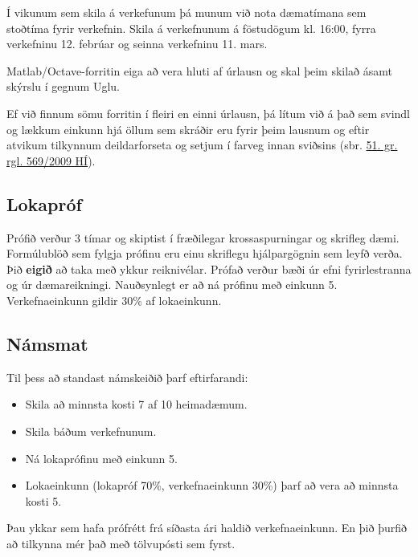 \documentclass[letterpaper,10pt,icelandic]{sphinxmanual}
\begin{document}
Í vikunum sem skila á verkefunum þá munum við nota dæmatímana sem stoðtíma fyrir verkefnin. Skila á verkefnunum á föstudögum kl. 16:00, fyrra verkefninu 12. febrúar og seinna verkefninu 11. mars.

Matlab/Octave-forritin eiga að vera hluti af úrlausn og skal þeim skilað ásamt skýrslu í gegnum Uglu.

Ef við finnum sömu forritin í fleiri en einni úrlausn, þá lítum við á það sem svindl og lækkum einkunn hjá öllum sem skráðir eru fyrir þeim lausnum og eftir atvikum tilkynnum deildarforseta og setjum í farveg innan sviðsins (sbr. \href{http://www.hi.is/adalvefur/reglur\_fyrir\_haskola\_islands\#51}{51. gr. rgl. 569/2009 HÍ}).


\subsection{Lokapróf}
\label{vidauki:lokaprof}
Prófið verður 3 tímar og skiptist í fræðilegar krossaspurningar og skrifleg dæmi. Formúlublöð sem fylgja prófinu eru einu
skriflegu hjálpargögnin sem leyfð verða.  Þið \textbf{eigið} að taka með ykkur reiknivélar. Prófað verður bæði úr efni fyrirlestranna og úr dæmareikningi. Nauðsynlegt er að ná prófinu með einkunn 5.  Verkefnaeinkunn gildir
30\% af lokaeinkunn.


\subsection{Námsmat}
\label{vidauki:namsmat}
Til þess að standast námskeiðið þarf eftirfarandi:
\begin{itemize}
\item {} 
Skila að minnsta kosti 7 af 10 heimadæmum.

\item {} 
Skila báðum verkefnunum.

\item {} 
Ná lokaprófinu með einkunn 5.

\item {} 
Lokaeinkunn (lokapróf 70\%, verkefnaeinkunn 30\%) þarf að vera að minnsta kosti 5.

\end{itemize}

Þau ykkar sem hafa prófrétt frá síðasta ári haldið verkefnaeinkunn. En þið þurfið að tilkynna mér það með tölvupósti sem fyrst.
\end{document}
